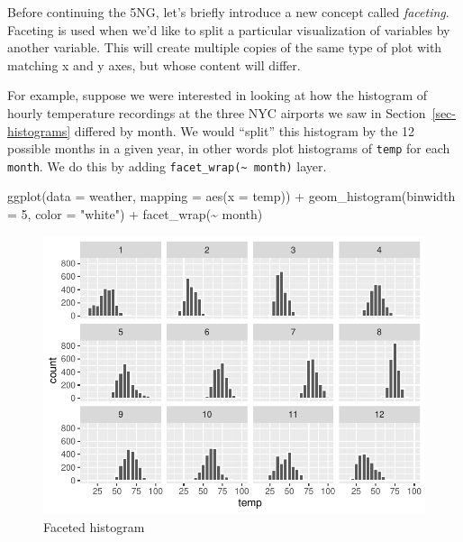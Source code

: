 \documentclass[
  letterpaper,
  DIV=11,
  numbers=noendperiod]{scrreprt}
\newenvironment{Shaded}{\begin{snugshade}}{\end{snugshade}}
\newcommand{\AttributeTok}[1]{\textcolor[rgb]{0.40,0.45,0.13}{#1}}
\newcommand{\DecValTok}[1]{\textcolor[rgb]{0.68,0.00,0.00}{#1}}
\newcommand{\FunctionTok}[1]{\textcolor[rgb]{0.28,0.35,0.67}{#1}}
\newcommand{\NormalTok}[1]{\textcolor[rgb]{0.00,0.23,0.31}{#1}}
\newcommand{\SpecialCharTok}[1]{\textcolor[rgb]{0.37,0.37,0.37}{#1}}
\newcommand{\StringTok}[1]{\textcolor[rgb]{0.13,0.47,0.30}{#1}}
\theoremstyle{definition}
\theoremstyle{remark}
\begin{document}
Before continuing the 5NG, let's briefly introduce a new concept called
\emph{faceting}. Faceting is used when we'd like to split a particular
visualization of variables by another variable. This will create
multiple copies of the same type of plot with matching x and y axes, but
whose content will differ.

For example, suppose we were interested in looking at how the histogram
of hourly temperature recordings at the three NYC airports we saw in
Section~\ref{sec-histograms} differed by month. We would ``split'' this
histogram by the 12 possible months in a given year, in other words plot
histograms of \texttt{temp} for each \texttt{month}. We do this by
adding \texttt{facet\_wrap(\textasciitilde{}\ month)} layer.

\begin{Shaded}
\begin{Highlighting}[]
\FunctionTok{ggplot}\NormalTok{(}\AttributeTok{data =}\NormalTok{ weather, }\AttributeTok{mapping =} \FunctionTok{aes}\NormalTok{(}\AttributeTok{x =}\NormalTok{ temp)) }\SpecialCharTok{+}
  \FunctionTok{geom\_histogram}\NormalTok{(}\AttributeTok{binwidth =} \DecValTok{5}\NormalTok{, }\AttributeTok{color =} \StringTok{"white"}\NormalTok{) }\SpecialCharTok{+}
  \FunctionTok{facet\_wrap}\NormalTok{(}\SpecialCharTok{\textasciitilde{}}\NormalTok{ month)}
\end{Highlighting}
\end{Shaded}

\begin{figure}[H]

{\centering \includegraphics{02-visualization_files/figure-pdf/fig-facethistogram-1.pdf}

}

\caption{\label{fig-facethistogram}Faceted histogram}

\end{figure}
\end{document}
